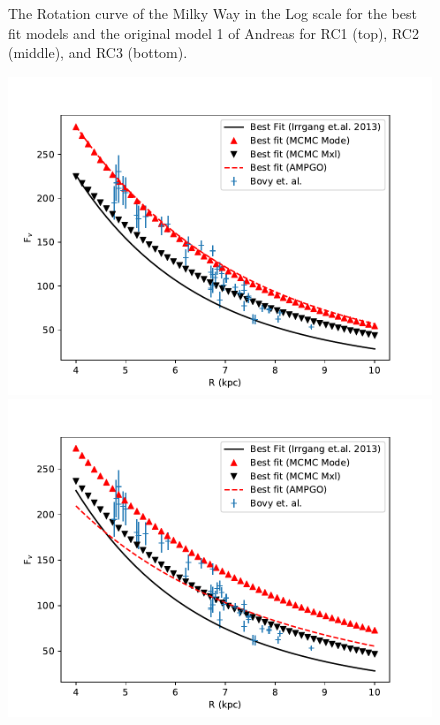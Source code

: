 \documentclass[fleqn,usenatbib]{mnras}
\begin{document}
\begin{figure}
\caption{The Rotation curve of the Milky Way in the Log scale for the best fit models and the original model 1 of Andreas for RC1 (top), RC2 (middle), and RC3 (bottom).
}
\label{fig:Model3_rc}
\end{figure}
\begin{figure}
\includegraphics[width=\columnwidth]{Model_III/Plots/Sofue(2009)/VertForce_ModelIII_10000_100.pdf}
\includegraphics[width=\columnwidth]{Model_III/Plots/Sofue(2021)/VertForce_ModelIII_10000_100.pdf}

\end{figure}
\end{document}
